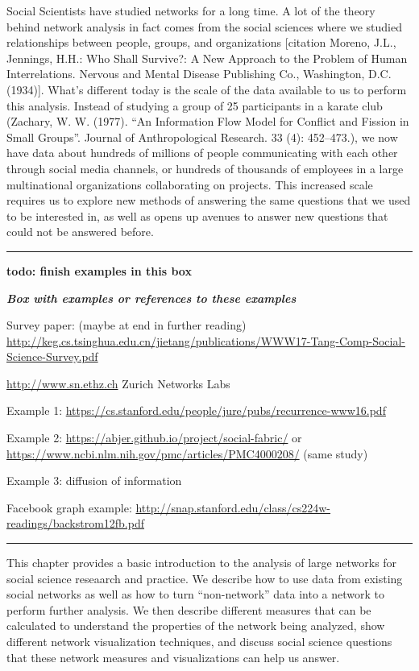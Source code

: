 \documentclass[]{krantz}
\begin{document}
Social Scientists have studied networks for a long time. A lot of the
theory behind network analysis in fact comes from the social sciences
where we studied relationships between people, groups, and organizations
{[}citation Moreno, J.L., Jennings, H.H.: Who Shall Survive?: A New
Approach to the Problem of Human Interrelations. Nervous and Mental
Disease Publishing Co., Washington, D.C. (1934){]}. What's different
today is the scale of the data available to us to perform this analysis.
Instead of studying a group of 25 participants in a karate club
(Zachary, W. W. (1977). ``An Information Flow Model for Conflict and
Fission in Small Groups''. Journal of Anthropological Research. 33 (4):
452--473.), we now have data about hundreds of millions of people
communicating with each other through social media channels, or hundreds
of thousands of employees in a large multinational organizations
collaborating on projects. This increased scale requires us to explore
new methods of answering the same questions that we used to be
interested in, as well as opens up avenues to answer new questions that
could not be answered before.

\begin{center}\rule{0.5\linewidth}{\linethickness}\end{center}

\textbf{todo: finish examples in this box}

\textbf{\emph{Box with examples or references to these examples}}

Survey paper: (maybe at end in further reading)
\url{http://keg.cs.tsinghua.edu.cn/jietang/publications/WWW17-Tang-Comp-Social-Science-Survey.pdf}

\url{http://www.sn.ethz.ch} Zurich Networks Labs

Example 1:
\url{https://cs.stanford.edu/people/jure/pubs/recurrence-www16.pdf}

Example 2: \url{https://abjer.github.io/project/social-fabric/} or
\url{https://www.ncbi.nlm.nih.gov/pmc/articles/PMC4000208/} (same study)

Example 3: diffusion of information

Facebook graph example:
\url{http://snap.stanford.edu/class/cs224w-readings/backstrom12fb.pdf}

\begin{center}\rule{0.5\linewidth}{\linethickness}\end{center}

This chapter provides a basic introduction to the analysis of large
networks for social science reseaarch and practice. We describe how to
use data from existing social networks as well as how to turn
``non-network'' data into a network to perform further analysis. We then
describe different measures that can be calculated to understand the
properties of the network being analyzed, show different network
visualization techniques, and discuss social science questions that
these network measures and visualizations can help us answer.
\end{document}
